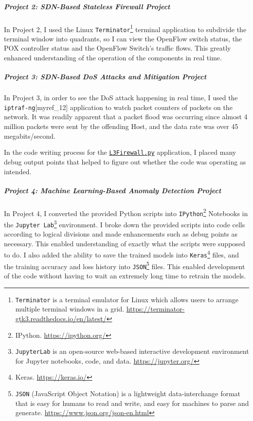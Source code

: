 \subparagraph{Project 2: SDN-Based Stateless Firewall Project}

In Project 2, I used the Linux \texttt{Terminator}\footnote{\texttt{Terminator} is a terminal emulator for Linux which allows users to arrange multiple terminal windows in a grid. \href{https://terminator-gtk3.readthedocs.io/en/latest/}{https://terminator-gtk3.readthedocs.io/en/latest/}} terminal application to subdivide the terminal window into quadrants, so I can view the OpenFlow switch status, the POX controller status and the OpenFlow Switch's traffic flows.  This greatly enhanced understanding of the operation of the components in real time.

\subparagraph{Project 3: SDN-Based DoS Attacks and Mitigation Project}

In Project 3, in order to see the DoS attack happening in real time, I used the \texttt{iptraf-ng}[myref\_12] application to watch packet counters of packets on the network.  It was readily apparent that a packet flood was occurring since almost 4 million packets were sent by the offending Host, and the data rate was over 45 megabits/second.

In the code writing process for the \href{/sections/mcs-projects/mcs-portfolio-project/l3firewall}{\texttt{L3Firewall.py}} application, I placed many debug output points that helped to figure out whether the code was operating as intended.

\subparagraph{Project 4: Machine Learning-Based Anomaly Detection Project}

In Project 4, I converted the provided Python scripts into \texttt{IPython}\footnote{IPython. \href{https://ipython.org/}{https://ipython.org/}} Notebooks in the \texttt{Jupyter Lab}\footnote{\texttt{JupyterLab} is an open-source web-based interactive development environment for Jupyter notebooks, code, and data. \href{https://jupyter.org/}{https://jupyter.org/}} environment.  I broke down the provided scripts into code cells according to logical divisions and made enhancements such as debug points as necessary.  This enabled understanding of exactly what the scripts were supposed to do.  I also added the ability to save the trained models into \texttt{Keras}\footnote{Keras. \url{https://keras.io/}} files, and the training accuracy and loss history into \texttt{JSON}\footnote{\texttt{JSON} (JavaScript Object Notation) is a lightweight data-interchange format that is easy for humans to read and write, and easy for machines to parse and generate. \href{https://www.json.org/json-en.html}{https://www.json.org/json-en.html}} files.  This enabled development of the code without having to wait an extremely long time to retrain the models.

